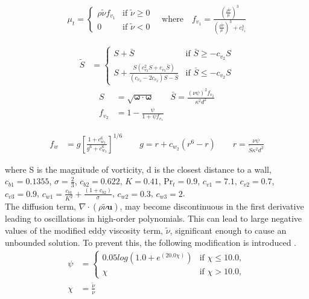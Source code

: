 \begin{align}
	 \mu_t =
	  \begin{cases}
	   \rho\tilde\nu f_{v_1} & \text{if } \tilde\nu \ge 0 \\
	   0       & \text{if } \tilde\nu < 0
	  \end{cases}
	  \quad \mbox{where} \quad f_{v_1} = \frac{\left(\frac{\rho\tilde\nu}{\mu}\right)^3}{\left(\frac{\rho\tilde\nu}{\mu}\right)^3 + c_{v_1}^3}
\end{align}

\begin{align}
	\tilde S &=
	\begin{cases}
	   S + \bar S & \text{if } \bar S \ge -c_{v_2}S \\
	   S + \frac{S(c_{v_2}^2 S + c_{v_3}\bar S)}{(c_{v_3} - 2c_{v_2})S - \bar S} & \text{if } \bar S \le -c_{v_2}S
	\end{cases}
\end{align}
\begin{align}
	S &= \sqrt{\boldsymbol{\omega}\cdot\boldsymbol{\omega}}
	\qquad \bar S = \frac{(\nu\psi)^2 f_{v_2}}{\kappa^2 d^2} \\
	f_{v_2} &= 1 - \frac{\psi}{1 + \psi f_{v_1}}
\end{align}

\begin{align}
	f_w &= g\left[\frac{1 + c_{w_3}^6}{g^6 + c_{w_3}^6}\right]^{1/6} 
	\qquad g = r + c_{w_2}(r^6 - r) 
	\qquad r = \frac{\nu\psi}{\tilde S \kappa^2 d^2}
\end{align}

where S is the magnitude of vorticity, d is the closest distance to a wall, $c_{b1} = 0.1355$, $\sigma = \frac{2}{3}$, $c_{b2} = 0.622$, $K = 0.41$, $\text{Pr}_t = 0.9$, $c_{v1} = 7.1$, $c_{v2} = 0.7$, $c_{v3} = 0.9$, $c_{w1} = \frac{c_{b1}}{K^2} + \frac{(1+c_{b2})}{\sigma}$, $c_{w2} = 0.3$, $c_{w3} = 2$.\\

The diffusion term, $\nabla\cdot(\rho\tilde\nu\boldsymbol{u})$, may become discontinuous in the first derivative leading to oscillations in high-order polynomials. This can lead to large negative values of the modified eddy viscosity term, $\tilde\nu$, significant enough to cause an unbounded solution. To prevent this, the following modification is introduced \cite{moro2011navier}.
\begin{align}
	\psi &=
	\begin{cases}
	   0.05log(1.0 + e^{(20.0\chi)}) & \text{if } \chi \le 10.0, \\
	   \chi & \text{if } \chi > 10.0,
	\end{cases} \\
	\chi &= \frac{\tilde\nu}{\nu}
\end{align}

